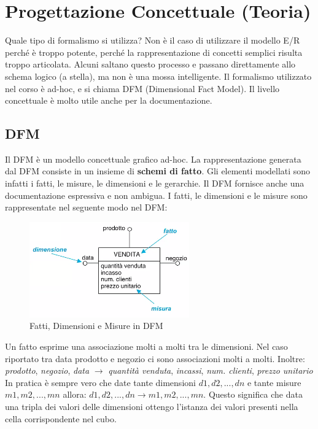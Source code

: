 
\section{Progettazione Concettuale (Teoria)}
Quale tipo di formalismo si utilizza? Non è il caso di utilizzare il modello E/R perché è troppo potente, perché la rappresentazione di concetti semplici risulta troppo articolata.\newline
Alcuni saltano questo processo e passano direttamente allo schema logico (a stella), ma non è una mossa intelligente.\newline
Il formalismo utilizzato nel corso è ad-hoc, e si chiama DFM (Dimensional Fact Model).
Il livello concettuale è molto utile anche per la documentazione.
\subsection{DFM}
Il DFM è un modello concettuale grafico ad-hoc. La rappresentazione generata dal DFM consiste in un insieme di \textbf{schemi di fatto}. Gli elementi modellati sono infatti i fatti, le misure, le dimensioni e le gerarchie. Il DFM fornisce anche una documentazione espressiva e non ambigua.\newline
I fatti, le dimensioni e le misure sono rappresentate nel seguente modo nel DFM:
\begin{figure}[H]
	\begin{center}
		\includegraphics[width=0.5\linewidth]{img/dfm.png}
		\caption{Fatti, Dimensioni e Misure in DFM}
	\end{center}
\end{figure}
\noindent Un fatto esprime una associazione molti a molti tra le dimensioni. Nel caso riportato tra data prodotto e negozio ci sono associazioni molti a molti. Inoltre:\newline
\textit{prodotto}, \textit{negozio}, \textit{data} $ \xrightarrow{} $ \textit{quantità venduta}, \textit{incassi}, \textit{num. clienti}, \textit{prezzo unitario}\newline
In pratica è sempre vero che date tante dimensioni $d1, d2, ..., dn$ e tante misure $m1, m2, ..., mn$ allora:
$d1, d2, ..., dn \xrightarrow{} m1, m2, ..., mn$.\newline
Questo significa che data una tripla dei valori delle dimensioni ottengo l'istanza dei valori presenti nella cella corrispondente nel cubo.\newline
